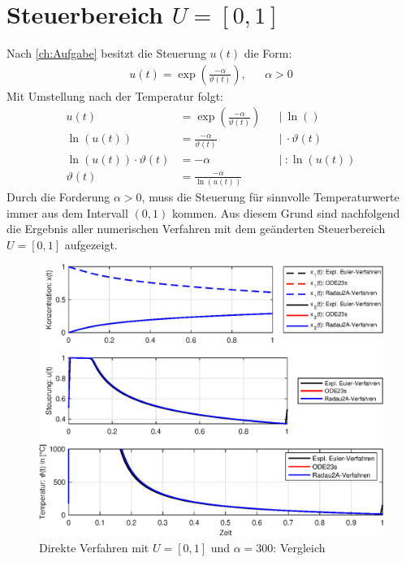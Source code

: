 \chapter{Steuerbereich \boldmath$U = [0,1]$}

Nach \autoref{ch:Aufgabe} besitzt die Steuerung $u(t)$ die Form:
\begin{align}
	u(t) = \exp\left(\frac{-\alpha}{\vartheta(t)}\right), &&\alpha > 0
\end{align}
Mit Umstellung nach der Temperatur folgt:
\begin{align}
	u(t) &= \exp\left(\frac{-\alpha}{\vartheta(t)}\right)			&&|\  \ln() \\
	\ln(u(t)) &= \frac{-\alpha}{\vartheta(t)}												&&|\  \cdot \vartheta(t) \\
	\ln(u(t)) \cdot \vartheta(t)&= -\alpha														&&|\  :  \ln(u(t)) \\
	\vartheta(t)&= \frac{-\alpha}{\ln(u(t))}
\end{align}
Durch die Forderung $\alpha > 0$, muss die Steuerung für sinnvolle Temperaturwerte immer aus dem Intervall $(0,1)$ kommen. Aus diesem Grund sind nachfolgend die Ergebnis aller numerischen Verfahren mit dem geänderten Steuerbereich $U = [0,1]$ aufgezeigt.
\begin{figure}[h!]
	\centering
	\includegraphics[width=1\textwidth]{images/CompareDirect_Method_U1}
	\caption{Direkte Verfahren mit $U=[0,1]$ und $\alpha = 300$: Vergleich}
	\label{fig:CompareDisk_U1}
\end{figure}

